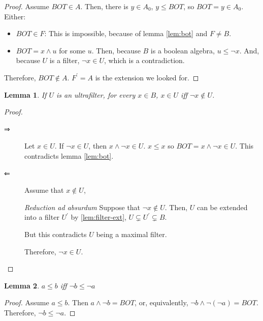 \documentclass{article}
\newtheorem{lemma}{Lemma}
\begin{document}
\begin{enumerate}
\begin{enumerate}
\begin{proof}
           Assume $BOT \in A$. Then, there is $y \in A_0$, $y ≤ BOT$,
           so $BOT = y \in A_0$. Either:

           \begin{itemize}
             \item $BOT \in F$: This is impossible, because of lemma \ref{lem:bot} and $F \neq B$.
             \item $BOT = x ∧ u$ for some $u$. Then, because $B$ is
               a boolean algebra, $u ≤ ¬x$. And, because $U$ is a filter,
               $¬x \in U$, which is a contradiction.
           \end{itemize}

           Therefore, $BOT \not \in A$. $F^\prime = A$ is the extension we
           looked for.
           
     \end{proof}
     
     \begin{lemma}\label{lem:neg}
       If $U$ is an ultrafilter, for every $x ∈ B$,
       $x ∈ U$ iff $¬x \not \in U$.
       
     \end{lemma}
     \begin{proof}

       \begin{description}
         
         \item[⇒] Let $x ∈ U$. If $¬x ∈ U$, then $x ∧ ¬x ∈ U$.
           $x ≤ x$ so $BOT = x ∧ ¬x ∈ U$. This contradicts lemma \ref{lem:bot}.

         \item[⇐] Assume that $x \not \in U$,

           {\em Reduction ad absurdum} Suppose that $¬x \not \in U$. Then,
           $U$ can be extended into a filter $U^\prime$ by \ref{lem:filter-ext},
           $U \subsetneq U^\prime \subsetneq B$.
           
           But this contradicts $U$ being a maximal filter.
           
           Therefore, $¬x \in U$.
            
        \end{description}
    \end{proof}

     \begin{lemma}\label{lem:compl-rev}
       $a ≤ b$ iff $¬b ≤ ¬a$
     \end{lemma}
     \begin{proof}
       Assume $a ≤ b$. Then $a ∧ ¬b = BOT$, or, equivalently,
       $¬b ∧ ¬(¬a) = BOT$. Therefore, $¬b ≤ ¬a$.
     \end{proof}


\end{enumerate}
\end{enumerate}
\end{document}
